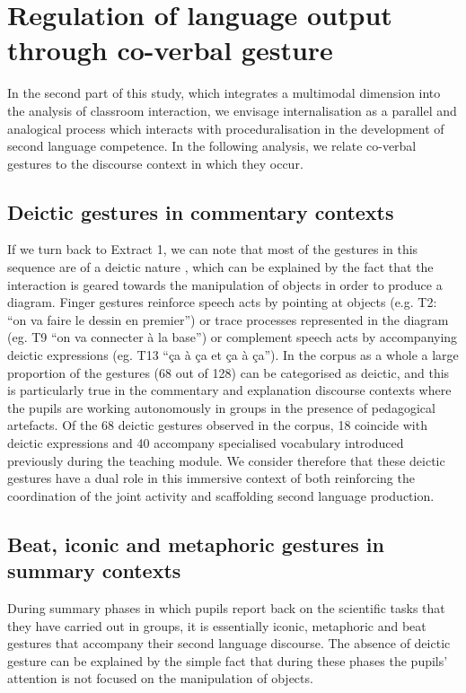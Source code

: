 \documentclass[output=paper]{langscibook}
\begin{document}
\section{Regulation of language output through co-verbal gesture} %

In the second part of this study, which integrates a multimodal dimension into the analysis of classroom interaction, we envisage internalisation as a parallel and analogical process which interacts with proceduralisation in the development of second language competence. In the following analysis, we relate co-verbal gestures to the discourse context in which they occur. 

\subsection{Deictic gestures in commentary contexts} %

If we turn back to Extract 1, we can note that most of the gestures in this sequence are of a deictic nature \citep{McNeill1992}, which can be explained by the fact that the interaction is geared towards the manipulation of objects in order to produce a diagram. Finger gestures reinforce speech acts by pointing at objects (e.g. T2: “on va faire le dessin en premier”) or trace processes represented in the diagram (eg. T9 “on va connecter à la base”) or complement speech acts by accompanying deictic expressions (eg. T13 “ça à ça et ça à ça”). In the corpus as a whole a large proportion of the gestures (68 out of 128) can be categorised as deictic, and this is particularly true in the commentary and explanation discourse contexts where the pupils are working autonomously in groups in the presence of pedagogical artefacts. Of the 68 deictic gestures observed in the corpus, 18 coincide with deictic expressions and 40 accompany specialised vocabulary introduced previously during the teaching module. We consider therefore that these deictic gestures have a dual role in this immersive context of both reinforcing the coordination of the joint activity and scaffolding second language production.

\subsection{Beat, iconic and metaphoric gestures in summary contexts} %

During summary phases in which pupils report back on the scientific tasks that they have carried out in groups, it is essentially iconic, metaphoric and beat gestures that accompany their second language discourse. The absence of deictic gesture can be explained by the simple fact that during these phases the pupils’ attention is not focused on the manipulation of objects. 
\end{document}
